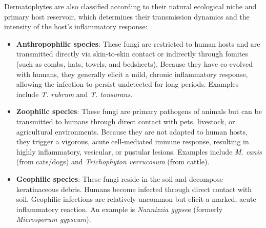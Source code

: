 Dermatophytes are also classified according to their natural ecological niche and primary host reservoir, which determines their transmission dynamics and the intensity of the host's inflammatory response:
\begin{itemize}
    \item \textbf{Anthropophilic species}: These fungi are restricted to human hosts and are transmitted directly via skin-to-skin contact or indirectly through fomites (such as combs, hats, towels, and bedsheets). Because they have co-evolved with humans, they generally elicit a mild, chronic inflammatory response, allowing the infection to persist undetected for long periods. Examples include \textit{T. rubrum} and \textit{T. tonsurans}.
    \item \textbf{Zoophilic species}: These fungi are primary pathogens of animals but can be transmitted to humans through direct contact with pets, livestock, or agricultural environments. Because they are not adapted to human hosts, they trigger a vigorous, acute cell-mediated immune response, resulting in highly inflammatory, vesicular, or pustular lesions. Examples include \textit{M. canis} (from cats/dogs) and \textit{Trichophyton verrucosum} (from cattle).
    \item \textbf{Geophilic species}: These fungi reside in the soil and decompose keratinaceous debris. Humans become infected through direct contact with soil. Geophilic infections are relatively uncommon but elicit a marked, acute inflammatory reaction. An example is \textit{Nannizzia gypsea} (formerly \textit{Microsporum gypseum}).
\end{itemize}

